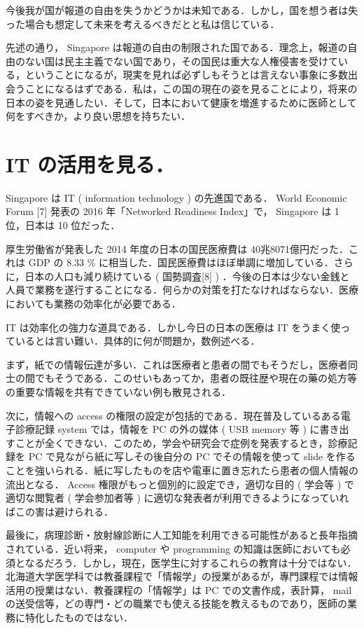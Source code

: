 \documentclass[10pt,uplatex]{jsarticle}
\begin{document}
今後我が国が報道の自由を失うかどうかは未知である．しかし，国を想う者は失った場合も想定して未来を考えるべきだとと私は信じている．

先述の通り， Singapore は報道の自由の制限された国である．理念上，報道の自由のない国は民主主義でない国であり，その国民は重大な人権侵害を受けている，ということになるが，現実を見れば必ずしもそうとは言えない事象に多数出会うことになるはずである．私は，この国の現在の姿を見ることにより，将来の日本の姿を見通したい．そして，日本において健康を増進するために医師として何をすべきか，より良い思想を持ちたい．

\section{IT の活用を見る．}

Singapore は IT ( information technology ) の先進国である． World Economic Forum [7] 発表の 2016 年「Networked Readiness Index」で， Singapore は 1 位，日本は 10 位だった．

厚生労働省が発表した 2014 年度の日本の国民医療費は 40兆8071億円だった．これは GDP の 8.33 \% に相当した．国民医療費はほぼ単調に増加している．さらに，日本の人口も減り続けている ( 国勢調査[8] ) ．今後の日本は少ない金銭と人員で業務を遂行することになる．何らかの対策を打たなければならない．医療においても業務の効率化が必要である．

IT は効率化の強力な道具である．しかし今日の日本の医療は IT をうまく使っているとは言い難い．具体的に何が問題か，数例述べる．

まず，紙での情報伝達が多い．これは医療者と患者の間でもそうだし，医療者同士の間でもそうである．このせいもあってか，患者の既往歴や現在の藥の処方等の重要な情報を共有できていない例も散見される．

次に，情報への access の権限の設定が包括的である．現在普及しているある電子診療記録 system では，情報を PC の外の媒体 ( USB memory 等 ) に書き出すことが全くできない．このため，学会や研究会で症例を発表するとき，診療記録を PC で見ながら紙に写しその後自分の PC でその情報を使って slide を作ることを強いられる．紙に写したものを店や電車に置き忘れたら患者の個人情報の流出となる． Access 権限がもっと個別的に設定でき，適切な目的 ( 学会等 ) で適切な閲覧者 ( 学会参加者等 ) に適切な発表者が利用できるようになっていればこの害は避けられる．

最後に，病理診断・放射線診断に人工知能を利用できる可能性があると長年指摘されている．近い将来， computer や programming の知識は医師においても必須となるだろう．しかし，現在，医学生に対するこれらの教育は十分ではない．北海道大学医学科では教養課程で「情報学」の授業があるが，專門課程では情報活用の授業はない．教養課程の「情報学」は PC での文書作成，表計算， mail の送受信等，どの専門・どの職業でも使える技能を教えるものであり，医師の業務に特化したものではない．
\end{document}
